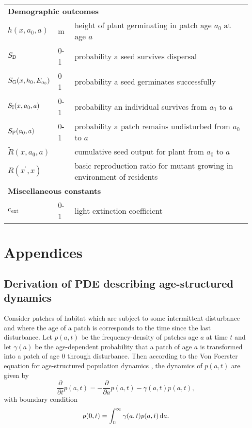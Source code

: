 \documentclass[10pt,twoside]{article}
\begin{document}
\begin{table}[ht]
\begin{tabular}{p{2cm}p{2cm}p{9cm}}
  \multicolumn{3}{l}{\textbf{Demographic outcomes}} \\
  $h(x,a_0,a)$   & m  & height of plant germinating in patch age $a_0$ at age $a$\\
  $S_{\rm D}$ & 0-1 & probability a seed survives dispersal \\
  $S_{\rm G} (x,h_0, E_{a_0})$ & 0-1 & probability a seed germinates successfully \\
  $S_{\rm I} (x, a_0, a)$ & 0-1 & probability an individual survives from $a_0$ to $a$\\
  $S_{\rm P} ( a_0, a)$ & 0-1 & probability a patch remains undisturbed from $a_0$ to $a$\\
  $\tilde{R}(x, a_0, a)$ & & cumulative seed output for plant from $a_0$ to $a$ \\
  $R\left(x^\prime,x\right)$ & & basic reproduction ratio for mutant growing in environment of residents \\
 
  \multicolumn{3}{l}{\textbf{Miscellaneous constants}} \\
  $c_\textrm{ext}$ & 0-1  & light extinction coefficient\\
  \hline
  \end{tabular}
\label{tab:definitions}
\end{table}

\clearpage

\section{Appendices}\label{appendices}

\subsection{Derivation of PDE describing age-structured
dynamics}\label{derivation-of-pde-describing-age-structured-dynamics}

Consider patches of habitat which are subject to some intermittent
disturbance and where the age of a patch is corresponds to the time
since the last disturbance. Let \(p(a,t)\) be the frequency-density of
patches age \(a\) at time \(t\) and let \(\gamma(a)\) be the
age-dependent probability that a patch of age \(a\) is transformed into
a patch of age \(0\) through disturbance. Then according to the Von
Foerster equation for age-structured population dynamics
\citep{Vonfoerster-1959}, the dynamics of \(p(a,t)\) are given by
\[ \frac{\partial }{\partial t} p(a,t)=-\frac{\partial }{\partial a} p(a,t)-\gamma(a,t)p(a,t),\]
with boundary condition
\[ p(0,t)=\int^{\infty}_{0}\gamma(a,t)p(a,t)\,{\rm d}a.\]
\end{document}
